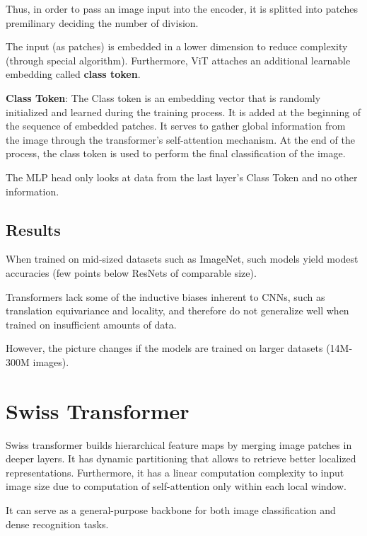 Thus, in order to pass an image input into the encoder, it is splitted into patches premilinary deciding the number of division.

The input (as patches) is embedded in a lower dimension to reduce
complexity (through special algorithm). Furthermore, ViT attaches an additional learnable embedding called \textbf{class token}.

\textbf{Class Token}: The Class token is an embedding vector that is randomly initialized and learned during the training process. It is added at the beginning of the sequence of embedded patches. It serves to gather global information from the image through the transformer's self-attention mechanism. At the end of the process, the class token is used to perform the final classification of the image.



The MLP head only looks at data from the last layer’s Class Token and no other information.




\subsection{Results}
When trained on mid-sized datasets such as ImageNet, such models yield modest accuracies (few points below ResNets of comparable size).

Transformers lack some of the inductive biases inherent to CNNs,
such as translation equivariance and locality, and therefore do not generalize well when trained on insufficient amounts of data.

However, the picture changes if the models are trained on larger
datasets (14M-300M images).

\section{Swiss Transformer}

Swiss transformer builds hierarchical feature maps by merging image
patches in deeper layers. It has dynamic partitioning that allows to retrieve better localized representations. Furthermore, it has a linear computation complexity to input image size due to computation of self-attention only within each local window.

It can serve as a general-purpose backbone for both image classification and dense recognition tasks.

